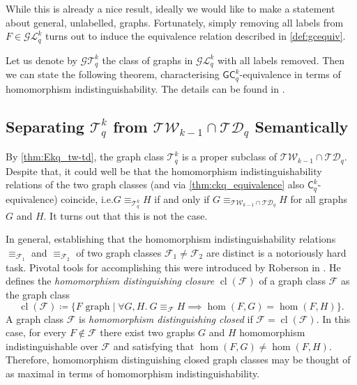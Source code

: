 \documentclass[a4paper,UKenglish,cleveref, autoref, thm-restate]{lipics-v2021}
\newcommand{\Ekq}{\ensuremath{\mathcal{T}_{q}^{k}}}
\newcommand{\Lkq}{\ensuremath{\mathcal{L}_{q}^{k}}}
\newcommand{\GEkq}{\ensuremath{\mathcal{G}\Lkq}}
\newcommand{\GEkqLL}{\ensuremath{\mathcal{G}\Ekq}}
\newcommand{\lGC}{\ensuremath{\mathsf{GC}}}
\DeclareMathOperator{\cl}{cl}
\begin{document}
While this is already a nice result, ideally we would like to make a statement about general, unlabelled, graphs. Fortunately, simply removing all labels from $F \in \GEkq$ turns out to induce the equivalence relation described in \cref{def:gcequiv}.

Let us denote by $\GEkqLL$ the class of graphs in $\GEkq$ with all labels removed. Then we can state the following theorem, characterising $\lGC^k_q$-equivalence in terms of homomorphism indistinguishability.
The details can be found in .

\guardedEkqLogic*




 
\subsection{Separating $\Ekq$ from $\mathcal{TW}_{k-1} \cap \mathcal{TD}_q$ Semantically}
By \cref{thm:Ekq_tw-td}, the graph class $\Ekq$ is a proper subclass of $\mathcal{TW}_{k-1} \cap \mathcal{TD}_q$. Despite that, it could well be that the homomorphism indistinguishability relations of the two graph classes (and via \cref{thm:ckq_equivalence} also $\mathsf{C}^k_q$-equivalence) coincide, i.e.\@ $G \equiv_{\Ekq} H$ if and only if $G \equiv_{\mathcal{TW}_{k-1} \cap \mathcal{TD}_q} H$ for all graphs $G$ and $H$. It turns out that this is not the case.

In general, establishing that the homomorphism indistinguishability relations $\equiv_{\mathcal{F}_1}$ and $\equiv_{\mathcal{F}_2}$ of two graph classes $\mathcal{F}_1 \neq \mathcal{F}_2$ are distinct is a notoriously hard task. 
Pivotal tools for accomplishing this were introduced by Roberson in \cite{roberson_oddomorphisms_2022}. He defines the \emph{homomorphism distinguishing closure} $\cl(\mathcal{F})$ of a graph class $\mathcal{F}$ as the graph class
\[
\cl(\mathcal{F}) \coloneqq \{ F \text{ graph} \mid \forall G, H.\ G \equiv_{\mathcal{F}} H \implies \hom(F, G) = \hom(F, H)\}.
\]
A graph class $\mathcal{F}$ is \emph{homomorphism distinguishing closed} if $\mathcal{F} = \cl(\mathcal{F})$. In this case, for every $F \not\in \mathcal{F}$ there exist two graphs $G$ and $H$ homomorphism indistinguishable over $\mathcal{F}$ and satisfying that $\hom(F, G) \neq \hom(F, H)$. 
Therefore, homomorphism distinguishing closed graph classes may be thought of as maximal in terms of homomorphism indistinguishability.
\end{document}
